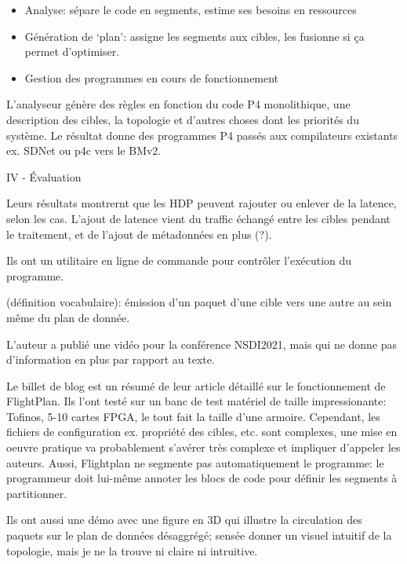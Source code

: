 \begin{itemize}
	\item Analyse: sépare le code en segments, estime ses besoins en ressources
	\item Génération de `plan': assigne les segments aux cibles, les fusionne si ça permet d'optimiser.
	\item Gestion des programmes en cours de fonctionnement
\end{itemize}

L'analyseur génère des règles en fonction du code P4 monolithique, une description des cibles, la topologie et d'autres choses dont les priorités du système. Le résultat donne des programmes P4 passés aux compilateurs existants ex. SDNet ou p4c vers le BMv2.

IV - Évaluation

Leurs résultats montrernt que les HDP peuvent rajouter ou enlever de la latence, selon les cas. L'ajout de latence vient du traffic échangé entre les cibles pendant le traitement, et de l'ajout de métadonnées en plus (?).

Ils ont un utilitaire en ligne de commande pour contrôler l'exécution du programme.

 (définition vocabulaire): émission d'un paquet d'une cible vers une autre au sein même du plan de donnée.

L'auteur a publié une vidéo pour la conférence NSDI2021, mais qui ne donne pas d'information en plus par rapport au texte.

 Le billet de blog est un résumé de leur article détaillé sur le fonctionnement de FlightPlan. Ils l'ont testé sur un banc de test matériel de taille impressionante: Tofinos, 5-10 cartes FPGA, le tout fait la taille d'une armoire. Cependant, les fichiers de configuration ex. propriété des cibles, etc. sont complexes, une mise en oeuvre pratique va probablement s'avérer très complexe et impliquer d'appeler les auteurs. Aussi, Flightplan ne segmente pas automatiquement le programme: le programmeur doit lui-même annoter les blocs de code pour définir les segments à partitionner.

Ils ont aussi une démo avec une figure en 3D qui illustre la circulation des paquets sur le plan de données désaggrégé; sensée donner un visuel intuitif de la topologie, mais je ne la trouve ni claire ni intruitive.

\clearpage
